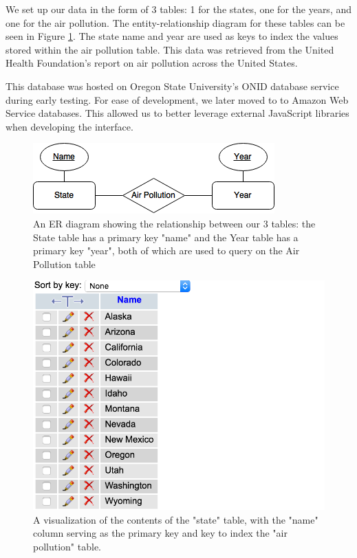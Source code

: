 \documentclass[journal]{vgtc}                %
\begin{document}
We set up our data in the form of 3 tables: 1 for the states, one for the years, and one for the air pollution. The 
entity-relationship diagram for these tables can be seen in Figure \ref{fig:ERdiagram}. 
The state name and year are used as keys to index the values stored within the air pollution table. This data was 
retrieved from the United Health Foundation's report on air pollution across the United States.

This database was hosted on Oregon State University's ONID database service during early testing. For ease of development,
we later moved to to Amazon Web Service databases. This allowed us to better leverage external JavaScript libraries
when developing the interface.

\begin{figure}
 \centering %
 \includegraphics[width=\columnwidth]{cs458-ER-diagram-ass1}
 \caption{An ER diagram showing the relationship between our 3 tables: the State table has a primary key "name" and the Year table has a primary key "year", both of which are used to query on the Air Pollution table}
 \label{fig:ERdiagram}
\end{figure}


\begin{figure}
\centering
\includegraphics[width=\columnwidth]{state_db}
\caption{A visualization of the contents of the "state" table, with the "name" column serving as the primary key and key 
to index the "air pollution" table.}
\label{fig:stateDB}
\end{figure}
\end{document}
